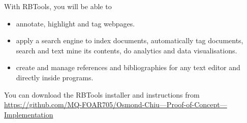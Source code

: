 \documentclass[unknownkeysallowed,usepdftitle=false, parskip=full, aspectratio-1610]{beamer}
\newcommand{\secvariable}{nothing}
\newcommand{\mysection}[1]{\renewcommand{\secvariable}{#1}
}
\begin{document}
\mysection{conclusion}
\begin{frame}\label{\secvariable}
  
With RBTools, you will be able to  
  \begin{itemize}
   \item annotate, highlight and tag webpages. 
  \item apply a search engine to index documents, automatically tag documents, search and text mine its contents, do analytics and data visualisations.
  \item create and manage references and bibliographies for any text editor and directly inside programs.

  \end{itemize}

  \vspace{0.5cm}

You can download the RBTools installer and instructions from \href{https://github.com/MQ-FOAR705/Osmond-Chiu---Proof-of-Concept---Implementation}{https://github.com/MQ-FOAR705/Osmond-Chiu---Proof-of-Concept---Implementation}

\end{frame}
\end{document}
